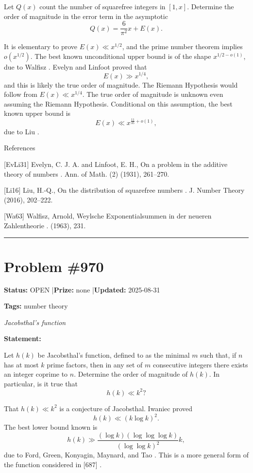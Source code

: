 \documentclass{article}
\begin{document}
Let $Q(x)$ count the number of squarefree integers in $[1,x]$. Determine the order of magnitude in the error term in the asymptotic\[Q(x)=\frac{6}{\pi^2}x+E(x).\]




It is elementary to prove $E(x)\ll x^{1/2}$, and the prime number theorem implies $o(x^{1/2})$. The best known unconditional upper bound is of the shape $x^{1/2-o(1)}$, due to Walfisz \cite{Wa63}. Evelyn and Linfoot \cite{EvLi31} proved that\[E(x) \gg x^{1/4},\]and this is likely the true order of magnitude. The Riemann Hypothesis would follow from $E(x)\ll x^{1/4}$. The true order of magnitude is unknown even assuming the Riemann Hypothesis. Conditional on this assumption, the best known upper bound is\[E(x)\ll x^{\frac{11}{35}+o(1)},\]due to Liu \cite{Li16}.




References

[EvLi31] Evelyn, C. J. A. and Linfoot, E. H., On a problem in the additive theory of numbers . Ann. of Math. (2) (1931), 261--270.

[Li16] Liu, H.-Q., On the distribution of squarefree numbers . J. Number Theory (2016), 202--222.

[Wa63] Walfisz, Arnold, Weylsche {E}xponentialsummen in der neueren {Z}ahlentheorie . (1963), 231.

\noindent\rule{\linewidth}{0.4pt}


\section{Problem \#970}
\label{prob:970}

\noindent\textbf{Status:} OPEN \quad|\quad \textbf{Prize:} none \quad|\quad \textbf{Updated:} 2025-08-31

\noindent\textbf{Tags:} number theory

\medskip
\noindent\textit{Jacobsthal's function}


\noindent\textbf{Statement:}

Let $h(k)$ be Jacobsthal's function, defined to as the minimal $m$ such that, if $n$ has at most $k$ prime factors, then in any set of $m$ consecutive integers there exists an integer coprime to $n$. Determine the order of magnitude of $h(k)$. In particular, is it true that\[h(k) \ll k^2?\]




That $h(k)\ll k^2$ is a conjecture of Jacobsthal. Iwaniec \cite{Iw78} proved\[h(k) \ll (k\log k)^2.\]The best lower bound known is\[h(k) \gg \frac{(\log k)(\log\log\log k)}{(\log\log k)^2}k,\]due to Ford, Green, Konyagin, Maynard, and Tao \cite{FGKMT18}. This is a more general form of the function considered in [687] .
\end{document}
